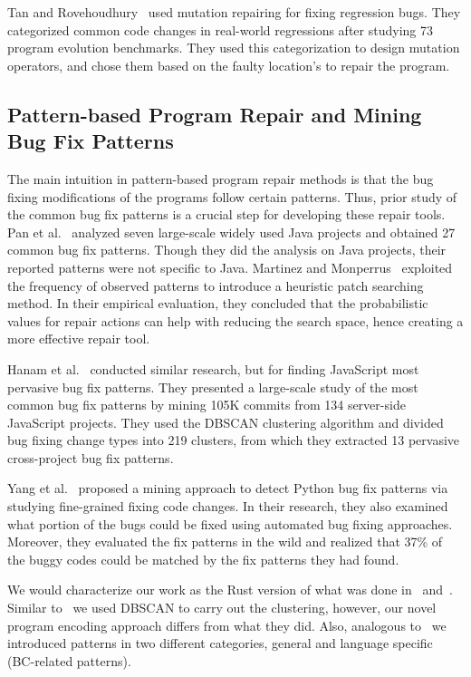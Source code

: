 Tan and Rovehoudhury~\cite{tan2015relifix} used mutation repairing for fixing regression bugs. They categorized common code changes in real-world regressions after studying 73 program evolution benchmarks. They used this categorization to design mutation operators, and chose them based on the faulty location’s to repair the program.

\subsection{Pattern-based Program Repair and Mining Bug Fix Patterns}

The main intuition in pattern-based program repair methods is that the bug fixing modifications of the programs follow certain patterns. Thus, prior study of the common bug fix patterns is a crucial step for developing these repair tools. Pan et al.~\cite{pan2009toward} analyzed seven large-scale widely used Java projects and obtained 27 common bug fix patterns. Though they did the analysis on Java projects, their reported patterns were not specific to Java. Martinez and Monperrus~\cite{martinez2015mining,martinez2012mining} exploited the frequency of observed patterns to introduce a heuristic patch searching method. In their empirical evaluation, they concluded that the probabilistic values for repair actions can help with reducing the search space, hence creating a more effective repair tool.

Hanam et al.~\cite{hanam2016discovering} conducted similar research, but for finding JavaScript most pervasive bug fix patterns. They presented a large-scale study of the most common bug fix patterns by mining 105K commits from 134 server-side JavaScript projects. They used the DBSCAN clustering algorithm and divided bug fixing change types into 219 clusters, from which they extracted 13 pervasive cross-project bug fix patterns. 

Yang et al.~\cite{yang2022mining} proposed a mining approach to detect Python bug fix patterns via studying fine-grained fixing code changes. In their research, they also examined what portion of the bugs could be fixed using automated bug fixing approaches. Moreover, they evaluated the fix patterns in the wild and realized that 37\% of the buggy codes could be matched by the fix patterns they had found. 

We would characterize our work as the Rust version of what was done in~\cite{hanam2016discovering} and~\cite{yang2022mining}. Similar to~\cite{hanam2016discovering} we used DBSCAN to carry out the clustering, however, our novel program encoding approach differs from what they did. Also, analogous to~\cite{yang2022mining} we introduced patterns in two different categories, general and language specific (BC-related patterns).

